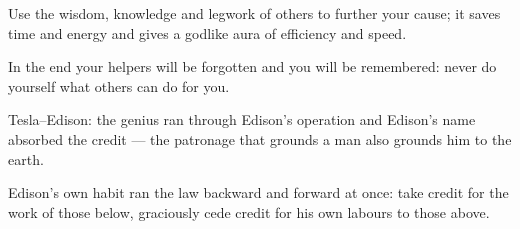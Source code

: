 

\begin{distilled}
  \item Use the wisdom, knowledge and legwork of others to further your cause; it saves time and energy and gives a godlike aura of efficiency and speed.
  \item In the end your helpers will be forgotten and you will be remembered: never do yourself what others can do for you.
  \item Tesla--Edison: the genius ran through Edison's operation and Edison's name absorbed the credit --- the patronage that grounds a man also grounds him to the earth.
  \item Edison's own habit ran the law backward and forward at once: take credit for the work of those below, graciously cede credit for his own labours to those above.
\end{distilled}
